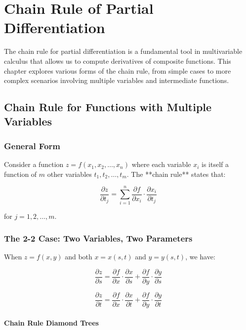\chapter{Chain Rule of Partial Differentiation}
\label{chap:chain-rule-of-partial-differentiation}

The chain rule for partial differentiation is a fundamental tool in multivariable calculus that allows us to compute derivatives of composite functions. This chapter explores various forms of the chain rule, from simple cases to more complex scenarios involving multiple variables and intermediate functions.

\section{Chain Rule for Functions with Multiple Variables}
\label{sec:chain-rule-multiple-variables}

\subsection{General Form}

Consider a function \(z = f(x_1, x_2, \ldots, x_n)\) where each variable \(x_i\) is itself a function of \(m\) other variables \(t_1, t_2, \ldots, t_m\). The **chain rule** states that:

\[
  \frac{\partial z}{\partial t_j} = \sum_{i=1}^{n} \frac{\partial f}{\partial x_i} \cdot \frac{\partial x_i}{\partial t_j}
\]

for \(j = 1, 2, \ldots, m\).

\subsection{The 2-2 Case: Two Variables, Two Parameters}

When \(z = f(x, y)\) and both \(x = x(s, t)\) and \(y = y(s, t)\), we have:

\[
  \frac{\partial z}{\partial s} = \frac{\partial f}{\partial x} \cdot \frac{\partial x}{\partial s} + \frac{\partial f}{\partial y} \cdot \frac{\partial y}{\partial s}
\]

\[
  \frac{\partial z}{\partial t} = \frac{\partial f}{\partial x} \cdot \frac{\partial x}{\partial t} + \frac{\partial f}{\partial y} \cdot \frac{\partial y}{\partial t}
\]

\subsubsection{Chain Rule Diamond Trees}


